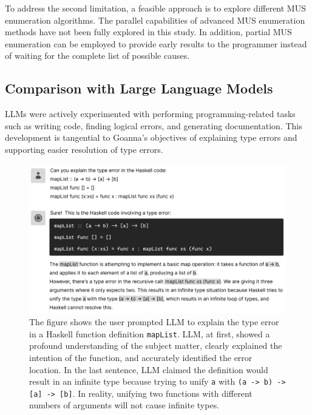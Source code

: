 \documentclass[pdflatex,lineno,sn-nature,Numbered]{sn-jnl}%
\begin{document}
To address the second limitation, a feasible approach is to explore different MUS enumeration algorithms. The parallel capabilities of advanced MUS enumeration methods \cite{Zhao2016-bu, Bendik2020-pz} have not been fully explored in this study. In addition, partial MUS enumeration \cite{Previti2013-mr, Liffiton2016-xi} can be employed to provide early results to the programmer instead of waiting for the complete list of possible causes.



\subsection{Comparison with Large Language Models} \label{sec:llm}
    
LLMs were actively experimented with performing programming-related tasks such as writing code, finding logical errors, and generating documentation.  This development is tangential to Goanna's objectives of explaining type errors and supporting easier resolution of type errors. 

\begin{figure}[hbt]
  \includegraphics[width=\linewidth]{images/LLM.pdf}
  \caption[LLM explaining a type error; it began very accurate, then went on to give incorrect and contradicting analysis]{\label{fig:llm}
  The figure shows the user prompted LLM to explain the type error in a Haskell function definition \texttt{mapList}. LLM, at first, showed a profound understanding of the subject matter, clearly explained the intention of the function, and accurately identified the error location. In the last sentence, LLM claimed the definition would result in an infinite type because trying to unify \texttt{a} with \texttt{(a -> b) -> [a] -> [b]}. In reality, unifying two functions with different numbers of arguments will not cause infinite types. 
    }
\end{figure}
\end{document}
